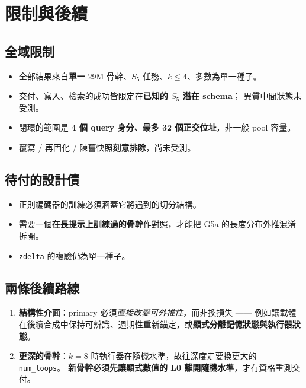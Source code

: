 \documentclass[11pt, a4paper]{article}
\begin{document}
\section{限制與後續}

\subsection{全域限制}

\begin{itemize}
  \item 全部結果來自\textbf{單一} 29M 骨幹、$S_5$ 任務、$k \leq 4$、多數為單一種子。
  \item 交付、寫入、檢索的成功皆限定在\textbf{已知的 $S_5$ 潛在 schema}；
        異質中間狀態未受測。
  \item 閉環的範圍是 \textbf{4 個 query 身分、最多 32 個正交位址}，非一般 pool 容量。
  \item 覆寫 / 再固化 / 陳舊快照\textbf{刻意排除}，尚未受測。
\end{itemize}

\subsection{待付的設計債}

\begin{itemize}
  \item 正則編碼器的訓練必須涵蓋它將遇到的切分結構。
  \item 需要一個\textbf{在長提示上訓練過的骨幹}作對照，才能把 G5a 的長度分布外推混淆拆開。
  \item \verb|zdelta| 的複驗仍為單一種子。
\end{itemize}

\subsection{兩條後續路線}

\begin{enumerate}
  \item \textbf{結構性介面}：primary 必須\emph{直接改變可外推性}，而非換損失 ——
        例如讓載體在後續合成中保持可辨識、週期性重新錨定，或\textbf{顯式分離記憶狀態與執行器狀態}。
  \item \textbf{更深的骨幹}：$k{=}8$ 時執行器在隨機水準，故往深度走要換更大的 \verb|num_loops|。
        \textbf{新骨幹必須先讓顯式數值的 L0 離開隨機水準}，才有資格重測交付。
\end{enumerate}
\end{document}
